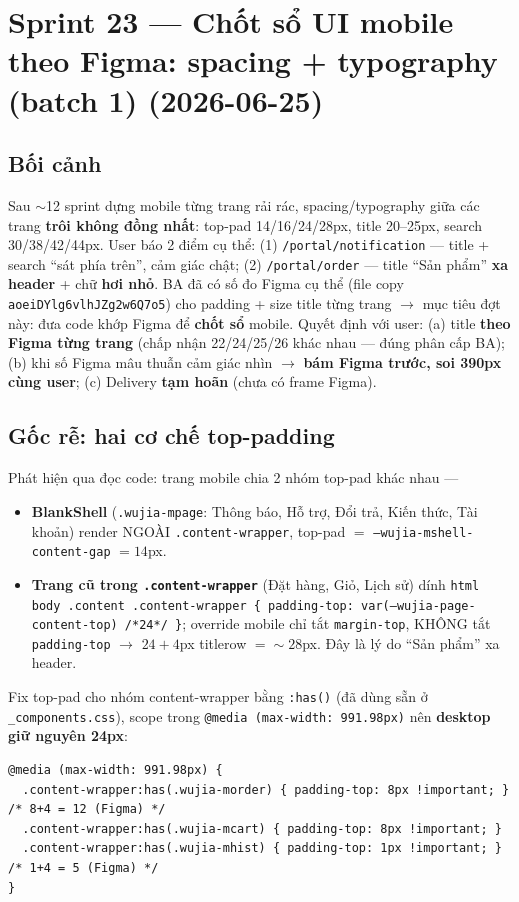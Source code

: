 \chapter{Sprint 23 --- Chốt sổ UI mobile theo Figma: spacing + typography (batch 1) (2026-06-25)}

\section{Bối cảnh}

Sau $\sim$12 sprint dựng mobile từng trang rải rác, spacing/typography giữa các trang \textbf{trôi không
đồng nhất}: top-pad 14/16/24/28px, title 20--25px, search 30/38/42/44px. User báo 2 điểm cụ thể:
(1) \texttt{/portal/notification} --- title + search ``sát phía trên'', cảm giác chật; (2)
\texttt{/portal/order} --- title ``Sản phẩm'' \textbf{xa header} + chữ \textbf{hơi nhỏ}. BA đã có số đo
Figma cụ thể (file copy \texttt{aoeiDYlg6vlhJZg2w6Q7o5}) cho padding + size title từng trang $\rightarrow$
mục tiêu đợt này: đưa code khớp Figma để \textbf{chốt sổ} mobile. Quyết định với user: (a) title
\textbf{theo Figma từng trang} (chấp nhận 22/24/25/26 khác nhau --- đúng phân cấp BA); (b) khi số Figma
mâu thuẫn cảm giác nhìn $\rightarrow$ \textbf{bám Figma trước, soi 390px cùng user}; (c) Delivery
\textbf{tạm hoãn} (chưa có frame Figma).

\section{Gốc rễ: hai cơ chế top-padding}

Phát hiện qua đọc code: trang mobile chia 2 nhóm top-pad khác nhau ---
\begin{itemize}
  \item \textbf{BlankShell} (\texttt{.wujia-mpage}: Thông báo, Hỗ trợ, Đổi trả, Kiến thức, Tài khoản) render
        NGOÀI \texttt{.content-wrapper}, top-pad $=$ \texttt{--wujia-mshell-content-gap} $= 14$px.
  \item \textbf{Trang cũ trong \texttt{.content-wrapper}} (Đặt hàng, Giỏ, Lịch sử) dính
        \texttt{html body .content .content-wrapper \{ padding-top: var(--wujia-page-content-top) /*24*/ \}};
        override mobile chỉ tắt \texttt{margin-top}, KHÔNG tắt \texttt{padding-top} $\rightarrow$ $24 + 4$px
        titlerow $= \sim 28$px. Đây là lý do ``Sản phẩm'' xa header.
\end{itemize}

Fix top-pad cho nhóm content-wrapper bằng \texttt{:has()} (đã dùng sẵn ở \texttt{\_components.css}), scope
trong \texttt{@media (max-width: 991.98px)} nên \textbf{desktop giữ nguyên 24px}:
\begin{lstlisting}
@media (max-width: 991.98px) {
  .content-wrapper:has(.wujia-morder) { padding-top: 8px !important; }  /* 8+4 = 12 (Figma) */
  .content-wrapper:has(.wujia-mcart) { padding-top: 8px !important; }
  .content-wrapper:has(.wujia-mhist) { padding-top: 1px !important; }   /* 1+4 = 5 (Figma) */
}
\end{lstlisting}

